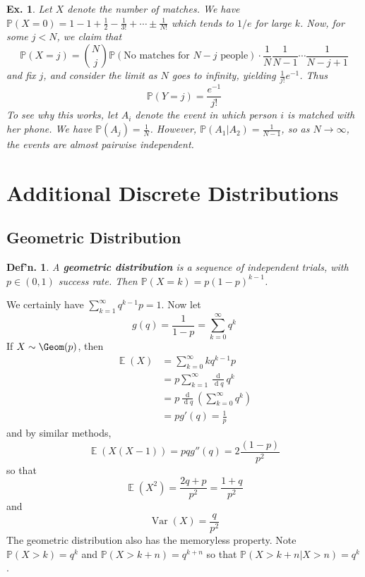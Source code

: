 \documentclass[12pt, a4paper]{book}
\DeclareMathOperator{\E}{\mathbb{E}}
\DeclareMathOperator{\Var}{Var}
\renewcommand{\Pr}{\mathbb{P}}
\renewcommand{\d}[1]{\ensuremath{\operatorname{d}\!{#1}}} %
\newtheorem{definition}[theorem]{Def'n.}
\newtheorem{example}[theorem]{Ex.}
\theoremstyle{nonumberplain}
\begin{document}
\begin{example}
    Let $X$ denote the number of matches.
    We have $\Pr(X=0)=1-1+\frac{1}{2}-\frac{1}{3!}+\cdots\pm\frac{1}{N!}$ which tends to $1/e$ for large $k$.
    Now, for some $j<N$, we claim that
    \[\Pr(X=j)=\binom{N}{j}\Pr(\text{No matches for $N-j$ people})\cdot\frac{1}{N}\frac{1}{N-1}\cdots\frac{1}{N-j+1}\]
    and fix $j$, and consider the limit as $N$ goes to infinity, yielding $\frac{1}{j!}{e^{-1}}$.
    Thus
    \[\Pr(Y=j)=\frac{e^{-1}}{j!}\]
    To see why this works, let $A_i$ denote the event in which person $i$ is matched with her phone.
    We have $\Pr(A_j)=\frac{1}{N}$.
    However, $\Pr(A_1|A_2)=\frac{1}{N-1}$, so as $N\to\infty$, the events are almost pairwise independent.
\end{example}
\section{Additional Discrete Distributions}
\subsection{Geometric Distribution}
\begin{definition}
    A \textbf{geometric distribution} is a sequence of independent trials, with $p\in(0,1)$ success rate.
    Then $\Pr(X=k)=p(1-p)^{k-1}$.
\end{definition}
We certainly have $\sum\limits_{k=1}^\infty q^{k-1}p=1$.
Now let
\[g(q)=\frac{1}{1-p}=\sum\limits_{k=0}^\infty q^k\]
If $X\sim\Geom(p)$, then
\begin{align*}
    \E(X)&=\sum\limits_{k=0}^\infty kq^{k-1}p\\
         &= p\sum\limits_{k=1}^\infty\frac{\d{}}{\d{q}}q^k\\
         &= p\frac{\d{}}{\d{q}}\left(\sum\limits_{k=0}^\infty q^k\right)\\
         &= pg'(q)=\frac{1}{p}
\end{align*}
and by similar methods,
\[\E(X(X-1))=pqg''(q)=2\frac{(1-p)}{p^2}\]
so that
\[\E(X^2)=\frac{2q+p}{p^2}=\frac{1+q}{p^2}\]
and
\[\Var(X)=\frac{q}{p^2}\]
The geometric distribution also has the memoryless property.
Note $\Pr(X>k)=q^k$ and $\Pr(X>k+n)=q^{k+n}$ so that $\Pr(X>k+n|X>n)=q^k$.
\end{document}
